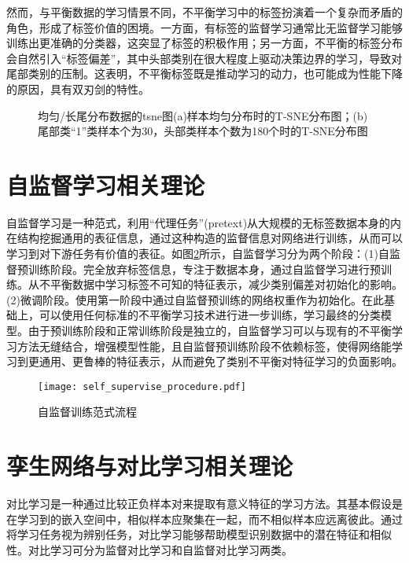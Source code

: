 \documentclass[master]{thesis-uestc}
\begin{document}
然而，与平衡数据的学习情景不同，不平衡学习中的标签扮演着一个复杂而矛盾的角色，形成了标签价值的困境。一方面，有标签的监督学习通常比无监督学习能够训练出更准确的分类器，这突显了标签的积极作用；另一方面，不平衡的标签分布会自然引入“标签偏差”，其中头部类别在很大程度上驱动决策边界的学习，导致对尾部类别的压制。这表明，不平衡标签既是推动学习的动力，也可能成为性能下降的原因，具有双刃剑的特性。
\begin{figure}[h]
    \caption{均匀/长尾分布数据的tsne图(a)样本均匀分布时的T-SNE分布图；(b)尾部类“1”类样本个为30，头部类样本个数为180个时的T-SNE分布图}
    \label{long-tail result}
\end{figure}

\section{自监督学习相关理论}
自监督学习是一种范式，利用“代理任务”(pretext)从大规模的无标签数据本身的内在结构挖掘通用的表征信息，通过这种构造的监督信息对网络进行训练，从而可以学习到对下游任务有价值的表征。如图\ref{self_supervise_procedure}所示，自监督学习分为两个阶段：(1)自监督预训练阶段。完全放弃标签信息，专注于数据本身，通过自监督学习进行预训练。从不平衡数据中学习标签不可知的特征表示，减少类别偏差对初始化的影响。(2)微调阶段。使用第一阶段中通过自监督预训练的网络权重作为初始化。在此基础上，可以使用任何标准的不平衡学习技术进行进一步训练，学习最终的分类模型。由于预训练阶段和正常训练阶段是独立的，自监督学习可以与现有的不平衡学习方法无缝结合，增强模型性能，且自监督预训练阶段不依赖标签，使得网络能学习到更通用、更鲁棒的特征表示，从而避免了类别不平衡对特征学习的负面影响。
\begin{figure}[h]
    \texttt{[image: self\_supervise\_procedure.pdf]}
    \caption{自监督训练范式流程}
    \label{self_supervise_procedure}
\end{figure}

\section{孪生网络与对比学习相关理论}
对比学习是一种通过比较正负样本对来提取有意义特征的学习方法。其基本假设是在学习到的嵌入空间中，相似样本应聚集在一起，而不相似样本应远离彼此。通过将学习任务视为辨别任务，对比学习能够帮助模型识别数据中的潜在特征和相似性。对比学习可分为监督对比学习和自监督对比学习两类。
\end{document}
